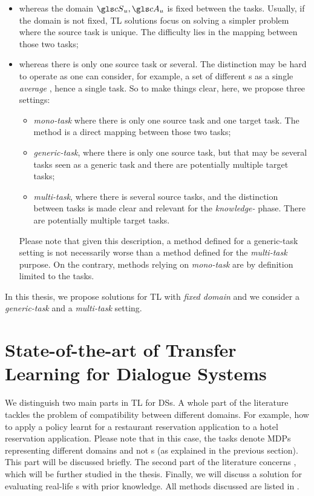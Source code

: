 \begin{itemize}
    \item whereas the domain $\cS_{u}, \cA_{u}$ is fixed between the tasks. Usually, if the domain is not fixed, \gls{TL} solutions focus on solving a simpler problem where the source task is unique. The difficulty lies in the mapping between those two tasks;
    \item whereas there is only one source task or several. The distinction may be hard to operate as one can consider, for example, a set of different s as a single \textit{average} , hence a single task. So to make things clear, here, we propose three settings:
\begin{itemize}
        \item \textit{mono-task}  where there is only one source task and one target task. The method is a direct mapping between those two tasks;
        \item \textit{generic-task}, where there is only one source task, but that may be several tasks seen as a generic task and there are potentially multiple target tasks;
        \item \textit{multi-task}, where there is several source tasks, and the distinction between tasks is made clear and relevant for the \textit{knowledge-} phase. There are potentially multiple target tasks.
\end{itemize}
    Please note that given this description, a method defined for a generic-task setting is not necessarily worse than a method defined for the \textit{multi-task} purpose. On the contrary, methods relying on \textit{mono-task}  are by definition limited to the tasks.

\end{itemize}

In this thesis, we propose solutions for  \gls{TL} with \textit{fixed domain} and we consider a \textit{generic-task} and a \textit{multi-task} setting.

\section{State-of-the-art of Transfer Learning for Dialogue Systems}

We distinguish two main parts in \gls{TL} for \glspl{DS}. A whole part of the literature tackles the problem of compatibility between different domains. For example, how to apply a policy learnt for a restaurant reservation application to a hotel reservation application. Please note that in this case, the tasks denote \glspl{MDP} representing different domains and not s (as explained in the previous section). This part will be discussed briefly. The second part of the literature concerns , which will be further studied in the thesis. Finally, we will discuss a solution for evaluating real-life s with prior knowledge. All methods discussed are listed in .

